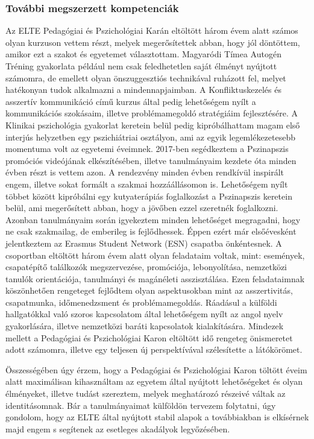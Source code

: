 \subsubsection*{További megszerzett kompetenciák}

\par Az ELTE Pedagógiai és Pszichológiai Karán eltöltött három évem alatt számos olyan kurzuson vettem részt, melyek megerősítettek abban, hogy jól döntöttem, amikor ezt a szakot és egyetemet választottam. Magyaródi Tímea Autogén Tréning gyakorlata például nem csak feledhetetlen saját élményt nyújtott számomra, de emellett olyan önszuggesztiós technikával ruházott fel, melyet hatékonyan tudok alkalmazni a mindennapjaimban. A Konfliktuskezelés és asszertív kommunikáció című kurzus által pedig lehetőségem nyílt a kommunikációs szokásaim, illetve problémamegoldó stratégiáim fejlesztésére. A Klinikai pszichológia gyakorlat keretein belül pedig kipróbálhattam magam első interjús helyzetben egy pszichiátriai osztályon, ami az egyik legemlékezetesebb momentuma volt az egyetemi éveimnek. 2017-ben segédkeztem a Pszinapszis promóciós videójának elkészítésében, illetve tanulmányaim kezdete óta minden évben részt is vettem azon. A rendezvény minden évben rendkívül inspirált engem, illetve sokat formált a szakmai hozzáállásomon is. Lehetőségem nyílt többet között kipróbálni egy kutyaterápiás foglalkozást a Pszinapszis keretein belül, ami megerősített abban, hogy a jövőben ezzel szeretnék foglalkozni. Azonban tanulmányaim során igyekeztem minden lehetőséget megragadni, hogy ne csak szakmailag, de emberileg is fejlődhessek. Éppen ezért már elsőévesként jelentkeztem az Erasmus Student Network (ESN) csapatba önkéntesnek. A csoportban eltöltött három évem alatt olyan feladataim voltak, mint: események, csapatépítő találkozók megszervezése, promóciója, lebonyolítása, nemzetközi tanulók orientációja, tanulmányi és magánéleti asszisztálása. Ezen feladataimnak köszönhetően rengeteget fejlődtem olyan aspektusokban mint az asszertivitás, csapatmunka, időmenedzsment és problémamegoldás. Ráadásul a külföldi hallgatókkal való szoros kapcsolatom által lehetőségem nyílt az angol nyelv gyakorlására, illetve nemzetközi baráti kapcsolatok kialakítására. Mindezek mellett a Pedagógiai és Pszichológiai Karon eltöltött idő rengeteg önismeretet adott számomra, illetve egy teljesen új perspektívával szélesítette a látókörömet. 
\\
\par Összességében úgy érzem, hogy a Pedagógiai és Pszichológiai Karon töltött éveim alatt maximálisan kihasználtam az egyetem által nyújtott lehetőségeket és olyan élményeket, illetve tudást szereztem, melyek meghatározó részeivé váltak az identitásomnak. Bár a tanulmányaimat külföldön tervezem folytatni, úgy gondolom, hogy az ELTE által nyújtott stabil alapok a továbbiakban is elkísérnek majd engem s segítenek az esetleges akadályok legyőzésében.